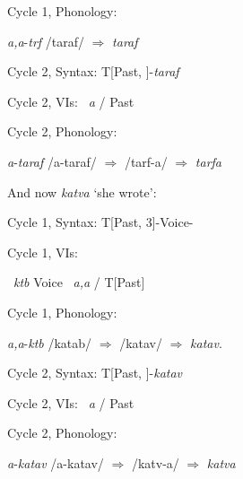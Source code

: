 \begin{exe}
\begin{xlist}
\begin{exe}
\begin{xlist}
\begin{exe}
\begin{xlist}
\begin{exe}
\begin{exe}
\begin{xlist}
\begin{exe}
\begin{xlist}
\begin{exe}
\begin{xlist}
\begin{exe}
\begin{xlist}
\begin{exe}
\begin{xlist}
\begin{exe}
\begin{xlist}
\begin{exe}
\begin{xlist}
\begin{exe}
\begin{xlist}
\begin{xlist}
\begin{exe}
\begin{xlist}
\begin{exe}
\begin{xlist}
\begin{exe}
\begin{xlist}
\begin{exe}
\begin{xlist}
\begin{exe}
\begin{xlist}
\begin{exe}
\begin{xlist}
\begin{exe}
\begin{xlist}
\begin{exe}
\begin{xlist}
\begin{exe}
\begin{xlist}
\begin{exe}
\begin{xlist}
\begin{exe}
\begin{xlist}
\begin{exe}
\begin{xlist}
 \ex  Cycle 1, Phonology: 
 \begin{xlist} 
 	\ex   \emph{a,a}-\emph{trf} 
 	\ex   /taraf/ $\Rightarrow$ \emph{taraf} 
 \z

\ex  Cycle 2, Syntax: 
	T[Past, ]-\emph{taraf}

\ex   Cycle 2, VIs: 
	 \lra~\emph{a} / Past \trace

 \ex  Cycle 2, Phonology: 
 \begin{xlist} 
 	\ex   \emph{a}-\emph{taraf} 
 	\ex   /a-taraf/ $\Rightarrow$ /tarf-a/ $\Rightarrow$ \emph{tarfa} 
 \z
\z 

And now \emph{katva} `she wrote':
 \begin{exe}
\ex  Cycle 1, Syntax: 
	T[Past, 3]-Voice-

 \ex  Cycle 1, VIs: 
 \begin{xlist} 
 	\ex  {} \lra~\emph{ktb} 
 	\ex   Voice \lra~\emph{a,a} / T[Past] \trace 
 \z

 \ex  Cycle 1, Phonology: 
 \begin{xlist} 
 	\ex   \emph{a,a}-\emph{ktb} 
 	\ex  	/katab/ $\Rightarrow$ /katav/ $\Rightarrow$ \emph{katav}. 
 \z

\ex   Cycle 2, Syntax: 
	T[Past, ]-\emph{katav}

\ex   Cycle 2, VIs: 
	 \lra~\emph{a} / Past \trace

 \ex  Cycle 2, Phonology: 
 \begin{xlist} 
 	\ex   \emph{a}-\emph{katav} 
 	\ex   /a-katav/ $\Rightarrow$ /katv-a/ $\Rightarrow$ \emph{katva} 
 \z
\z 


\end{xlist}
\end{xlist}
\end{xlist}
\end{exe}
\end{xlist}
\end{xlist}
\end{xlist}
\end{exe}
\end{xlist}
\end{exe}
\end{xlist}
\end{exe}
\end{xlist}
\end{exe}
\end{xlist}
\end{exe}
\end{xlist}
\end{exe}
\end{xlist}
\end{exe}
\end{xlist}
\end{exe}
\end{xlist}
\end{exe}
\end{xlist}
\end{exe}
\end{xlist}
\end{exe}
\end{xlist}
\end{exe}
\end{xlist}
\end{xlist}
\end{exe}
\end{xlist}
\end{exe}
\end{xlist}
\end{exe}
\end{xlist}
\end{exe}
\end{xlist}
\end{exe}
\end{xlist}
\end{exe}
\end{xlist}
\end{exe}
\end{xlist}
\end{exe}
\end{exe}
\end{xlist}
\end{exe}
\end{xlist}
\end{exe}
\end{xlist}
\end{exe}
